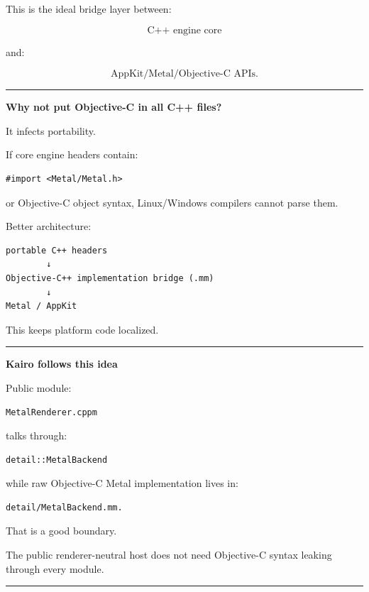 This is the ideal bridge layer between:

\[
\text{C++ engine core}
\]

and:

\[
\text{AppKit/Metal/Objective-C APIs}.
\]

\begin{center}\rule{0.5\linewidth}{0.5pt}\end{center}

\textbf{Why not put Objective-C in all C++ files?}

It infects portability.

If core engine headers contain:

\begin{verbatim}
#import <Metal/Metal.h>
\end{verbatim}

or Objective-C object syntax, Linux/Windows compilers cannot parse them.

Better architecture:

\begin{verbatim}
portable C++ headers
        ↓
Objective-C++ implementation bridge (.mm)
        ↓
Metal / AppKit
\end{verbatim}

This keeps platform code localized.

\begin{center}\rule{0.5\linewidth}{0.5pt}\end{center}

\textbf{Kairo follows this idea}

Public module:

\begin{verbatim}
MetalRenderer.cppm
\end{verbatim}

talks through:

\begin{verbatim}
detail::MetalBackend
\end{verbatim}

while raw Objective-C Metal implementation lives in:

\begin{verbatim}
detail/MetalBackend.mm.
\end{verbatim}

That is a good boundary.

The public renderer-neutral host does not need Objective-C syntax leaking through every module.

\begin{center}\rule{0.5\linewidth}{0.5pt}\end{center}

